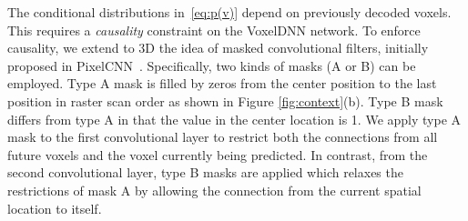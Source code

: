 \par The conditional distributions in~\eqref{eq:p(v)} depend on previously decoded voxels. This requires a \textit{causality} constraint on the VoxelDNN network. To enforce causality, we extend to 3D the idea of masked convolutional filters, initially proposed in PixelCNN~\cite{oord2016pixel}. Specifically, two kinds of masks (A or B) can be employed. Type A mask is filled by zeros from the center position to the last position in raster scan order as shown in Figure \ref{fig:context}(b). Type B mask differs from type A in that the value in the center location is 1. We apply type A mask to the first convolutional layer to restrict both the connections from all future voxels and the voxel currently being predicted.  In contrast, from the second convolutional layer, type B masks are applied which relaxes the restrictions of mask A by allowing the connection from the current spatial location to itself. 



